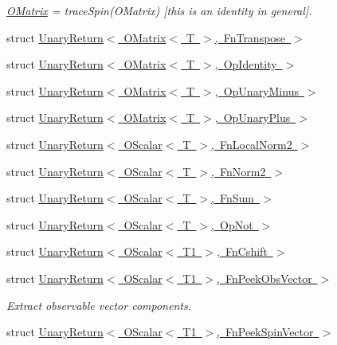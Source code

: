 \begin{DoxyCompactItemize}
\begin{DoxyCompactList}\small\item\em \mbox{\hyperlink{classENSEM_1_1OMatrix}{O\+Matrix}} = trace\+Spin(\+O\+Matrix) \mbox{[}this is an identity in general\mbox{]}. \end{DoxyCompactList}\item 
struct \mbox{\hyperlink{structENSEM_1_1UnaryReturn_3_01OMatrix_3_01T_01_4_00_01FnTranspose_01_4}{Unary\+Return$<$ O\+Matrix$<$ T $>$, Fn\+Transpose $>$}}
\item 
struct \mbox{\hyperlink{structENSEM_1_1UnaryReturn_3_01OMatrix_3_01T_01_4_00_01OpIdentity_01_4}{Unary\+Return$<$ O\+Matrix$<$ T $>$, Op\+Identity $>$}}
\item 
struct \mbox{\hyperlink{structENSEM_1_1UnaryReturn_3_01OMatrix_3_01T_01_4_00_01OpUnaryMinus_01_4}{Unary\+Return$<$ O\+Matrix$<$ T $>$, Op\+Unary\+Minus $>$}}
\item 
struct \mbox{\hyperlink{structENSEM_1_1UnaryReturn_3_01OMatrix_3_01T_01_4_00_01OpUnaryPlus_01_4}{Unary\+Return$<$ O\+Matrix$<$ T $>$, Op\+Unary\+Plus $>$}}
\item 
struct \mbox{\hyperlink{structENSEM_1_1UnaryReturn_3_01OScalar_3_01T_01_4_00_01FnLocalNorm2_01_4}{Unary\+Return$<$ O\+Scalar$<$ T $>$, Fn\+Local\+Norm2 $>$}}
\item 
struct \mbox{\hyperlink{structENSEM_1_1UnaryReturn_3_01OScalar_3_01T_01_4_00_01FnNorm2_01_4}{Unary\+Return$<$ O\+Scalar$<$ T $>$, Fn\+Norm2 $>$}}
\item 
struct \mbox{\hyperlink{structENSEM_1_1UnaryReturn_3_01OScalar_3_01T_01_4_00_01FnSum_01_4}{Unary\+Return$<$ O\+Scalar$<$ T $>$, Fn\+Sum $>$}}
\item 
struct \mbox{\hyperlink{structENSEM_1_1UnaryReturn_3_01OScalar_3_01T_01_4_00_01OpNot_01_4}{Unary\+Return$<$ O\+Scalar$<$ T $>$, Op\+Not $>$}}
\item 
struct \mbox{\hyperlink{structENSEM_1_1UnaryReturn_3_01OScalar_3_01T1_01_4_00_01FnCshift_01_4}{Unary\+Return$<$ O\+Scalar$<$ T1 $>$, Fn\+Cshift $>$}}
\item 
struct \mbox{\hyperlink{structENSEM_1_1UnaryReturn_3_01OScalar_3_01T1_01_4_00_01FnPeekObsVector_01_4}{Unary\+Return$<$ O\+Scalar$<$ T1 $>$, Fn\+Peek\+Obs\+Vector $>$}}
\begin{DoxyCompactList}\small\item\em Extract observable vector components. \end{DoxyCompactList}\item 
struct \mbox{\hyperlink{structENSEM_1_1UnaryReturn_3_01OScalar_3_01T1_01_4_00_01FnPeekSpinVector_01_4}{Unary\+Return$<$ O\+Scalar$<$ T1 $>$, Fn\+Peek\+Spin\+Vector $>$}}

\end{DoxyCompactItemize}
